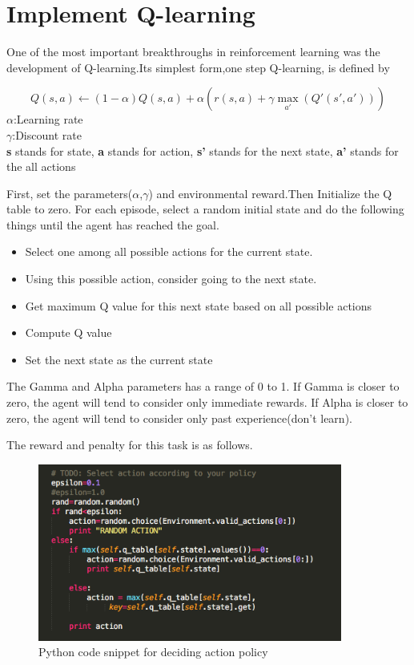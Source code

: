 \documentclass[a4paper,11pt]{article}
\begin{document}
\section{Implement Q-learning}
One of the most important breakthroughs in reinforcement learning was the development of Q-learning.Its simplest form,one step Q-learning, is defined by

\begin{equation}
	Q(s,a)\leftarrow (1-\alpha)Q(s,a)+\alpha(r(s,a)+\gamma \max_{a'}(Q'(s',a')))
\end{equation}
$\alpha$:Learning rate　\\
$\gamma$:Discount rate \\
{\bf s} stands for state, {\bf a} stands for action, {\bf s'} stands for the next state, {\bf a'} stands for the all actions


First, set the parameters($\alpha$,$\gamma$) and environmental reward.Then Initialize the Q table to zero. For each episode, select a random initial state and do the following things until the agent has reached the goal.
\begin{itemize}
\item Select one among all possible actions for the current state.
\item Using this possible action, consider going to the next state.
\item Get maximum Q value for this next state based on all possible actions
\item Compute Q value
\item Set the next state as the current state
\end{itemize}


The Gamma and Alpha parameters has a range of 0 to 1. If Gamma is closer to zero, the agent will tend to consider only immediate rewards. If Alpha is closer to zero, the agent will tend to consider only past experience(don't learn).

The reward and penalty for this task is as follows.




\begin{figure}[H]
\begin{center}
\includegraphics[width=100mm]{graph/python_code.jpg}
\end{center}
\caption{Python code snippet for deciding action policy}
\label{fig:1}
\end{figure}
\end{document}
